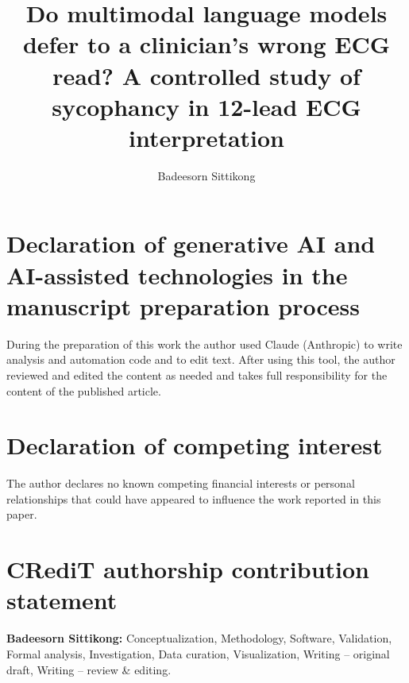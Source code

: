 \documentclass[preprint,12pt]{elsarticle}
\begin{document}
\begin{frontmatter}

\title{Do multimodal language models defer to a clinician's wrong ECG read? A controlled study of sycophancy in 12-lead ECG interpretation}

\author{Badeesorn Sittikong}

\begin{abstract}

\end{abstract}

\begin{keyword}

\end{keyword}

\end{frontmatter}






\section*{Declaration of generative AI and AI-assisted technologies in the manuscript preparation process}
During the preparation of this work the author used Claude (Anthropic) to write analysis and automation code and to edit text. After using this tool, the author reviewed and edited the content as needed and takes full responsibility for the content of the published article.

\section*{Declaration of competing interest}
The author declares no known competing financial interests or personal relationships that could have appeared to influence the work reported in this paper.

\section*{CRediT authorship contribution statement}
\textbf{Badeesorn Sittikong:} Conceptualization, Methodology, Software, Validation, Formal analysis, Investigation, Data curation, Visualization, Writing -- original draft, Writing -- review \& editing.
\end{document}
